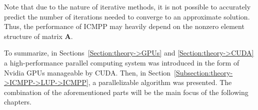 Note that due to the nature of iterative methods, it is not possible to accurately predict the number of iterations needed to converge to an approximate solution.
Thus, the performance of ICMPP may heavily depend on the nonzero element structure of matrix $\mathbf{A}$.

To summarize, in Sections~\ref{Section:theory->GPUs} and \ref{Section:theory->CUDA} a high-performance parallel computing system was introduced in the form of Nvidia GPUs manageable by CUDA.
Then, in Section~\ref{Subsection:theory->ICMPP->LUP->ICMPP}, a parallelizable algorithm was presented.
The combination of the aforementioned parts will be the main focus of the following chapters.